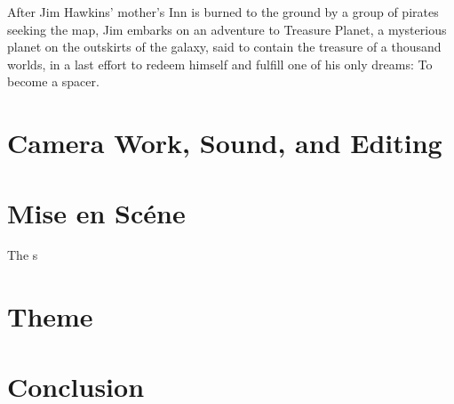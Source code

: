 \documentclass{fhnwreport}
\begin{document}
\begin{multicols}{2}
After Jim Hawkins' mother's Inn is burned to the ground by a group of pirates seeking the map, Jim embarks on an adventure to Treasure Planet, a mysterious planet on the outskirts of the galaxy, said to contain the treasure of a thousand worlds, in a last effort to redeem himself and fulfill one of his only dreams: To become a spacer.

\section{Camera Work, Sound, and Editing}



\section{Mise en Sc\'ene}

The s

\section{Theme}

\section{Conclusion}

\printbibliography

\end{multicols}
\end{document}
